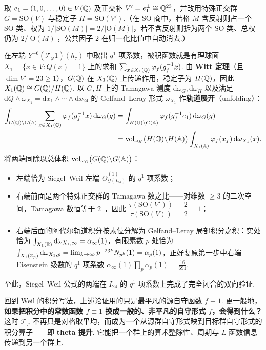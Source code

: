 取 $e_1=(1,0,\ldots,0)\in V(\mathbb{Q})$ 及正交补 $V'=e_1^\perp\cong\mathbb{Q}^{23}$，并改用特殊正交群 $G=\mathrm{SO}(V)$ 与稳定子 $H=\mathrm{SO}(V')$.（在 $\mathrm{SO}$ 商中，若格 $M$ 含反射则占一个 $\mathrm{SO}$-类、权为 $1/|\mathrm{SO}(M)|=2/|\mathrm O(M)|$，若不含反射则拆为两个 $\mathrm{SO}$-类、总权仍为 $2/|\mathrm O(M)|$，公共因子 $2$ 在归一化比值中自动消去.）

在左端 $Y^{-6}(\mathcal T_\varphi 1)(h_\tau)$ 中取出 $q^1$ 项系数，被积函数就是有理球面 $X_1=\{x\in V:Q(x)=1\}$ 上的求和 $\sum_{x\in X_1(\mathbb{Q})}\varphi_f(g_f^{-1}x)$. 由 \textbf{Witt 定理}（且 $\dim V'=23\ge 1$），$G(\mathbb{Q})$ 在 $X_1(\mathbb{Q})$ 上传递作用，稳定子为 $H(\mathbb{Q})$，因此 $X_1(\mathbb{Q})\cong G(\mathbb{Q})/H(\mathbb{Q})$. 以 $G,H$ 上的 Tamagawa 测度 $\mathrm d\omega_G,\mathrm d\omega_H$ 以及满足 $\mathrm dQ\wedge\omega_{X_1}=\mathrm dx_1\wedge\cdots\wedge\mathrm dx_{24}$ 的 Gelfand--Leray 形式 $\omega_{X_1}$ 作\textbf{轨道展开}（unfolding）：
\[
\begin{aligned}
\int_{G(\mathbb{Q})\backslash G(\mathbb{A})}\sum_{x\in X_1(\mathbb{Q})}\varphi_f(g_f^{-1}x)\,\mathrm d\omega_G(g)
&=\int_{H(\mathbb{Q})\backslash G(\mathbb{A})}\varphi_f(g_f^{-1}e_1)\,\mathrm d\omega_G(g)\\
&=\operatorname{vol}_{\omega_H}\bigl(H(\mathbb{Q})\backslash H(\mathbb{A})\bigr)
  \int_{X_1(\mathbb{A})}\varphi_f(x_f)\,\mathrm d\omega_{X_1}(x).
\end{aligned}
\]
将两端同除以总体积 $\operatorname{vol}_{\omega_G}\bigl(G(\mathbb{Q})\backslash G(\mathbb{A})\bigr)$：
\begin{itemize}
\item 左端恰为 Siegel--Weil 左端 $\overline{\Theta}_{\mathcal G(I_{24})}^{(1)}$ 的 $q^1$ 项系数；
\item 右端前面是两个特殊正交群的 Tamagawa 数之比——对维数 $\ge 3$ 的二次空间，Tamagawa 数恒等于 $2$~\cite{Weil1982}，因此 $\dfrac{\tau(\mathrm{SO}(V'))}{\tau(\mathrm{SO}(V))}=\dfrac{2}{2}=1$；
\item 右端后面的阿代尔轨道积分按素位分解为 Gelfand--Leray 局部积分之积：实处恰为 $\int_{X_1(\mathbb{R})}\mathrm d\omega_{X_1,\infty}=\alpha_\infty(1)$，有限素数 $p$ 处恰为 $\int_{X_1(\mathbb{Z}_p)}\mathrm d\omega_{X_1,p}=\lim_{k\to\infty}p^{-23k}N_{p^k}(1)=\alpha_p(1)$，正好复原第一步中右端 Eisenstein 级数的 $q^1$ 项系数 $\alpha_\infty(1)\prod_p\alpha_p(1)=\frac{16}{691}$.
\end{itemize}
至此，Siegel--Weil 公式的两端在 $I_{24}$ 的 $q^1$ 项系数上完成了完全闭合的双向验证.

回到 Weil 的积分写法，上述论证用的只是最平凡的源自守函数 $f\equiv 1$. 更一般地，\textbf{如果把积分中的常数函数 $f\equiv 1$ 换成一般的、非平凡的自守形式 $f$，会得到什么？} 这时 $\mathcal T_\varphi$ 不再只是对格取平均，而成为一个从源群自守形式映到目标群自守形式的积分算子——即 \textbf{theta 提升}. 它能把一个群上的算术整除性、周期与 $L$ 函数信息传递到另一个群上.

